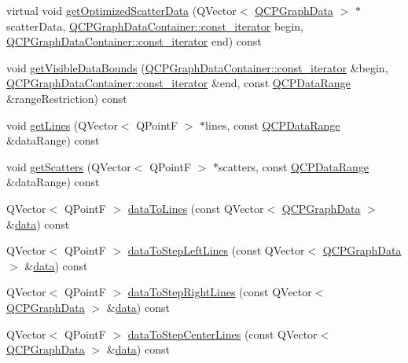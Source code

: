 \begin{DoxyCompactItemize}
virtual void \hyperlink{class_q_c_p_graph_a5423245898537e375b9364cf26e89aea}{get\+Optimized\+Scatter\+Data} (Q\+Vector$<$ \hyperlink{class_q_c_p_graph_data}{Q\+C\+P\+Graph\+Data} $>$ $\ast$scatter\+Data, \hyperlink{class_q_c_p_data_container_ae40a91f5cb0bcac61d727427449b7d15}{Q\+C\+P\+Graph\+Data\+Container\+::const\+\_\+iterator} begin, \hyperlink{class_q_c_p_data_container_ae40a91f5cb0bcac61d727427449b7d15}{Q\+C\+P\+Graph\+Data\+Container\+::const\+\_\+iterator} end) const
\item 
void \hyperlink{class_q_c_p_graph_a8599447a7f8cbbdcf0b94edcc11df560}{get\+Visible\+Data\+Bounds} (\hyperlink{class_q_c_p_data_container_ae40a91f5cb0bcac61d727427449b7d15}{Q\+C\+P\+Graph\+Data\+Container\+::const\+\_\+iterator} \&begin, \hyperlink{class_q_c_p_data_container_ae40a91f5cb0bcac61d727427449b7d15}{Q\+C\+P\+Graph\+Data\+Container\+::const\+\_\+iterator} \&end, const \hyperlink{class_q_c_p_data_range}{Q\+C\+P\+Data\+Range} \&range\+Restriction) const
\item 
void \hyperlink{class_q_c_p_graph_a563c6da2126300a4d9d2bdee30dad040}{get\+Lines} (Q\+Vector$<$ Q\+PointF $>$ $\ast$lines, const \hyperlink{class_q_c_p_data_range}{Q\+C\+P\+Data\+Range} \&data\+Range) const
\item 
void \hyperlink{class_q_c_p_graph_a9d7ba5904fdcaca413222335d4b283c3}{get\+Scatters} (Q\+Vector$<$ Q\+PointF $>$ $\ast$scatters, const \hyperlink{class_q_c_p_data_range}{Q\+C\+P\+Data\+Range} \&data\+Range) const
\item 
Q\+Vector$<$ Q\+PointF $>$ \hyperlink{class_q_c_p_graph_a0085ee728fdd72a827c1e6ced4476363}{data\+To\+Lines} (const Q\+Vector$<$ \hyperlink{class_q_c_p_graph_data}{Q\+C\+P\+Graph\+Data} $>$ \&\hyperlink{class_q_c_p_graph_a141aa31a1f19bbd0ce60f55eaeb9ea60}{data}) const
\item 
Q\+Vector$<$ Q\+PointF $>$ \hyperlink{class_q_c_p_graph_a1f3e9e41fc67538c4940c74665840474}{data\+To\+Step\+Left\+Lines} (const Q\+Vector$<$ \hyperlink{class_q_c_p_graph_data}{Q\+C\+P\+Graph\+Data} $>$ \&\hyperlink{class_q_c_p_graph_a141aa31a1f19bbd0ce60f55eaeb9ea60}{data}) const
\item 
Q\+Vector$<$ Q\+PointF $>$ \hyperlink{class_q_c_p_graph_ab1fb6cb91d24a854f85bf54200f6d101}{data\+To\+Step\+Right\+Lines} (const Q\+Vector$<$ \hyperlink{class_q_c_p_graph_data}{Q\+C\+P\+Graph\+Data} $>$ \&\hyperlink{class_q_c_p_graph_a141aa31a1f19bbd0ce60f55eaeb9ea60}{data}) const
\item 
Q\+Vector$<$ Q\+PointF $>$ \hyperlink{class_q_c_p_graph_a238116f1898c49cb8209d61707b5b367}{data\+To\+Step\+Center\+Lines} (const Q\+Vector$<$ \hyperlink{class_q_c_p_graph_data}{Q\+C\+P\+Graph\+Data} $>$ \&\hyperlink{class_q_c_p_graph_a141aa31a1f19bbd0ce60f55eaeb9ea60}{data}) const

\end{DoxyCompactItemize}

